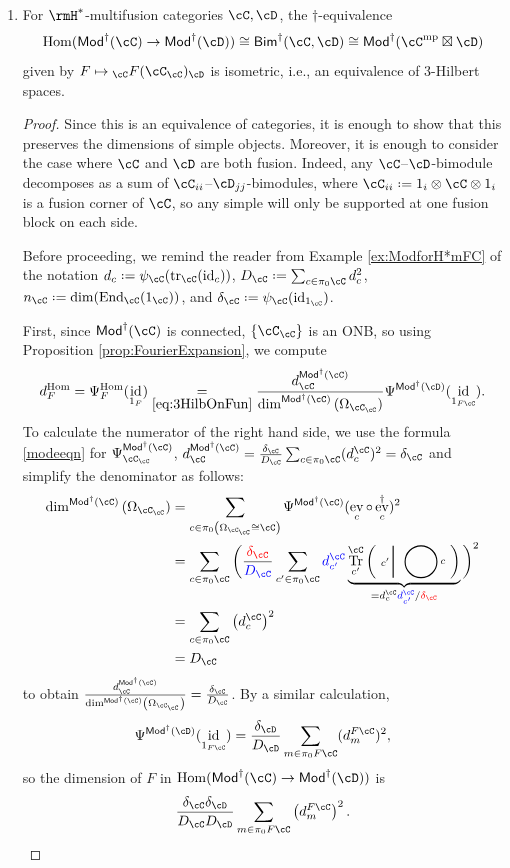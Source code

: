 \documentclass[12pt, reqno]{amsart}
\newcommand{\tikzmath}[2][]
{\vcenter{\hbox{\begin{tikzpicture}[#1]#2\end{tikzpicture}}}
}
\newcommand{\Bim}{\mathsf{Bim}}
\DeclareMathOperator{\End}{End}
\DeclareMathOperator{\ev}{ev}
\DeclareMathOperator{\Hom}{Hom}
\DeclareMathOperator{\id}{id}
\DeclareMathOperator{\Tr}{Tr}
\DeclareMathOperator{\tr}{tr}
\newcommand{\Mod}{\mathsf{Mod}}
\theoremstyle{plain}
\theoremstyle{definition}
\newcommand{\coloneq}{:=}
\def\coloneq{\mathrel{\vcenter{\baselineskip0.55ex\lineskiplimit0pt\hbox{\upshape.}\hbox{\upshape.}}}=}
\begin{document}
\begin{enumerate}[label=(D\arabic*)]
\item\label{fact:hom-is-bim}
For $\rmH^*$-multifusion categories $\cC,\cD$,
the $\dag$-equivalence 
$$
\Hom(\Mod^\dag(\cC)\to\Mod^\dag(\cD)) \cong \Bim^\dag(\cC,\cD) \cong \Mod^\dag(\cC^{\mathrm{mp}}\boxtimes \cD)  
$$
given by $F \mapsto {}_\cC F(\cC_\cC)_\cD$ is isometric, i.e., an equivalence of 3-Hilbert spaces.
\begin{proof}
Since this is an equivalence of categories, it is enough to show that this preserves the dimensions of simple objects.
Moreover, it is enough to consider the case where $\cC$ and $\cD$ are both fusion.
Indeed, any $\cC$--$\cD$-bimodule decomposes as a sum of $\cC_{ii}$--$\cD_{jj}$-bimodules, where $\cC_{ii} \coloneq 1_i\otimes\cC\otimes 1_i$ is a fusion corner of $\cC$, so any simple will only be supported at one fusion block on each side. 

Before proceeding, we remind the reader from Example \ref{ex:ModforH*mFC} of the notation $d_c\coloneq\psi_\cC(\tr_\cC(\id_c))$, $D_\cC\coloneq \sum_{c\in\pi_0\cC} d_c^2$, $n_\cC\coloneq\dim(\End_\cC(1_\cC))$, and $\delta_\cC\coloneq \psi_\cC(\id_{1_\cC})$. 

First, since $\Mod^\dag(\cC)$ is connected, $\{\cC_\cC\}$ is an ONB, so using Proposition \ref{prop:FourierExpansion}, we compute
$$
d_F^{\Hom}
=
\Psi^{\Hom}_F(\id_{1_F}) 
\underset{\eqref{eq:3HilbOnFun}}{=}
\frac{d_\cC^{\Mod^\dag(\cC)}}{\dim^{\Mod^\dag(\cC)}\left( \Omega_{\cC_\cC} \right) }\Psi^{\Mod^\dag(\cD)}(\id_{1_{F\cC}}).
$$
To calculate the numerator of the right hand side, we use the formula \eqref{modeeqn} for $\Psi^{\Mod^\dag(\cC)}_{\cC_\cC}$, $
d_\cC^{\Mod^\dag(\cC)}
=
\frac{\delta_\cC}{D_\cC}\sum_{c\in\pi_0\cC} (d^{\cC}_c)^2
=
\delta_\cC
$
and simplify the denominator as follows:
\begin{align*}
\dim^{\Mod^\dag(\cC)}\left( \Omega_{\cC_\cC}\right) &= \sum_{c\in \pi_0\left(\Omega_{\cC_\cC}\cong \cC\right)}\Psi^{\Mod^\dag(\cC)}(\ev_c\circ\ev_c^\dag)^2
\\
&= \sum_{c\in\pi_0\cC }\bigg(\frac{\textcolor{red}{\delta_\cC}}{\textcolor{blue}{D_\cC}}\sum_{c'\in\pi_0\cC}\textcolor{blue}{d^\cC_{c'}}\underbrace{
\Tr^\cC_{c'}\left(\tikzmath{
\draw[thick] (0,0) arc (0:360:.4);
\draw[thick] (-1.1,-.4) -- ++(0,.8);
\node at (-1.3,0) {{$\scriptstyle c'$}};
\node at (.15,0) {$\scriptstyle c$};}\right)
}_{=d^\cC_c\textcolor{blue}{d^\cC_{c'}}/\textcolor{red}{\delta_\cC}}\bigg)^2 \\
&= 
\sum_{c\in\pi_0\cC}\left(d_c^\cC\right)^2\\
&=
D_\cC
\end{align*}
to obtain $\frac{d_\cC^{\Mod^\dag(\cC)}}{\dim^{\Mod^\dag(\cC)}\left( \Omega_{\cC_\cC} \right) } = \frac{\delta_\cC}{D_\cC}$.
By a similar calculation, 
$$
\Psi^{\Mod^\dag(\cD)}(\id_{1_{F\cC}}) = \frac{\delta_\cD}{D_\cD}\sum_{m \in \pi_0F\cC}(d_m^{F\cC})^2,
$$ 
so the dimension of $F$ in $\Hom(\Mod^\dag(\cC) \to \Mod^\dag(\cD))$ is
\[
\frac{\delta_\cC\delta_\cD}{D_\cC D_\cD}\sum_{m\in\pi_0F\cC} \left(d_m^{F\cC}\right)^2.
\]


\end{proof}
\end{enumerate}
\end{document}
